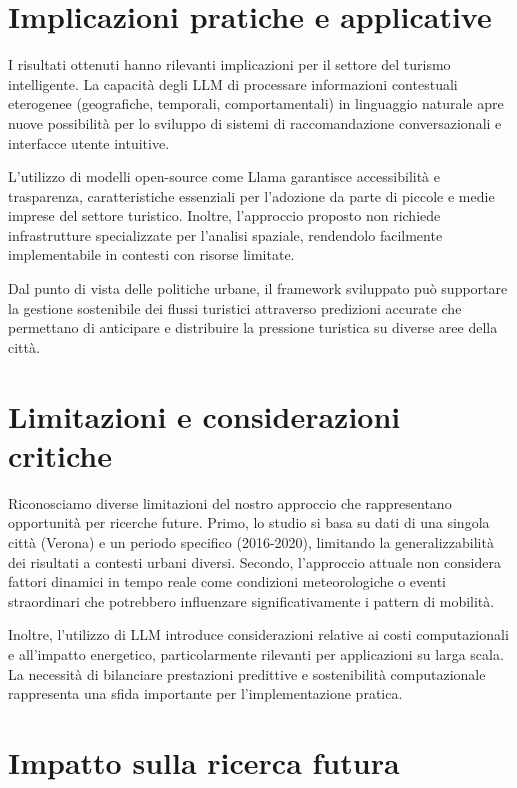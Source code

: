 \section{Implicazioni pratiche e applicative}

I risultati ottenuti hanno rilevanti implicazioni per il settore del turismo intelligente. La capacità degli LLM di processare informazioni contestuali eterogenee (geografiche, temporali, comportamentali) in linguaggio naturale apre nuove possibilità per lo sviluppo di sistemi di raccomandazione conversazionali e interfacce utente intuitive.

L'utilizzo di modelli open-source come Llama garantisce accessibilità e trasparenza, caratteristiche essenziali per l'adozione da parte di piccole e medie imprese del settore turistico. Inoltre, l'approccio proposto non richiede infrastrutture specializzate per l'analisi spaziale, rendendolo facilmente implementabile in contesti con risorse limitate.

Dal punto di vista delle politiche urbane, il framework sviluppato può supportare la gestione sostenibile dei flussi turistici attraverso predizioni accurate che permettano di anticipare e distribuire la pressione turistica su diverse aree della città.

\section{Limitazioni e considerazioni critiche}

Riconosciamo diverse limitazioni del nostro approccio che rappresentano opportunità per ricerche future. Primo, lo studio si basa su dati di una singola città (Verona) e un periodo specifico (2016-2020), limitando la generalizzabilità dei risultati a contesti urbani diversi. Secondo, l'approccio attuale non considera fattori dinamici in tempo reale come condizioni meteorologiche o eventi straordinari che potrebbero influenzare significativamente i pattern di mobilità.

Inoltre, l'utilizzo di LLM introduce considerazioni relative ai costi computazionali e all'impatto energetico, particolarmente rilevanti per applicazioni su larga scala. La necessità di bilanciare prestazioni predittive e sostenibilità computazionale rappresenta una sfida importante per l'implementazione pratica.

\section{Impatto sulla ricerca futura}

